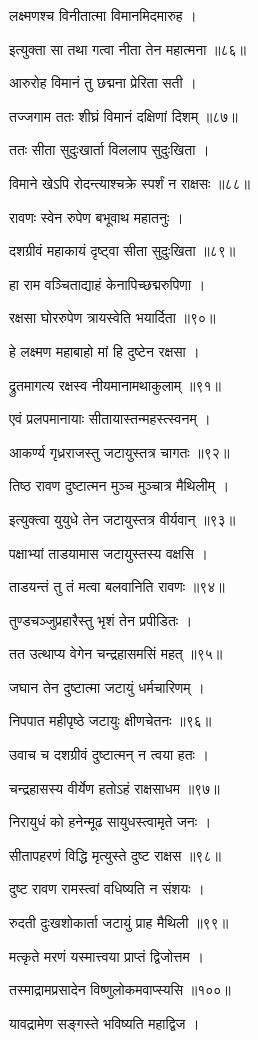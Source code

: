 लक्ष्मणश्च विनीतात्मा विमानमिदमारुह ।

इत्युक्ता सा तथा गत्वा नीता तेन महात्मना ॥८६॥

आरुरोह विमानं तु छद्मना प्रेरिता सती ।

तज्जगाम ततः शीघ्रं विमानं दक्षिणां दिशम् ॥८७॥

ततः सीता सुदुःखार्ता विललाप सुदुःखिता ।

विमाने खेऽपि रोदन्त्याश्चक्रे स्पर्शं न राक्षसः ॥८८॥

रावणः स्वेन रुपेण बभूवाथ महातनुः ।

दशग्रीवं महाकायं दृष्ट्वा सीता सुदुःखिता ॥८९॥

हा राम वञ्चिताद्याहं केनापिच्छद्मरुपिणा ।

रक्षसा घोररुपेण त्रायस्वेति भयार्दिता ॥९०॥

हे लक्ष्मण महाबाहो मां हि दुष्टेन रक्षसा ।

द्रुतमागत्य रक्षस्व नीयमानामथाकुलाम् ॥९१॥

एवं प्रलपमानायाः सीतायास्तन्महस्त्स्वनम् ।

आकर्ण्य गृध्रराजस्तु जटायुस्तत्र चागतः ॥९२॥

तिष्ठ रावण दुष्टात्मन मुञ्च मुञ्चात्र मैथिलीम् ।

इत्युक्त्वा युयुधे तेन जटायुस्तत्र वीर्यवान् ॥९३॥

पक्षाभ्यां ताडयामास जटायुस्तस्य वक्षसि ।

ताडयन्तं तु तं मत्वा बलवानिति रावणः ॥९४॥

तुण्डचञ्जुप्रहारैस्तु भृशं तेन प्रपीडितः ।

तत उत्थाप्य वेगेन चन्द्रहासमसिं महत् ॥९५॥

जघान तेन दुष्टात्मा जटायुं धर्मचारिणम् ।

निपपात महीपृष्ठे जटायुः क्षीणचेतनः ॥९६॥

उवाच च दशग्रीवं दुष्टात्मन् न त्वया हतः ।

चन्द्रहासस्य वीर्येण हतोऽहं राक्षसाधम ॥९७॥

निरायुधं को हनेन्मूढ सायुधस्त्वामृते जनः ।

सीतापहरणं विद्धि मृत्युस्ते दुष्ट राक्षस ॥९८॥

दुष्ट रावण रामस्त्वां वधिष्यति न संशयः ।

रुदती दुःखशोकार्ता जटायुं प्राह मैथिली ॥९९॥

मत्कृते मरणं यस्मात्त्वया प्राप्तं द्विजोत्तम ।

तस्माद्रामप्रसादेन विष्णुलोकमवाप्स्यसि ॥१००॥

यावद्रामेण सङ्गस्ते भविष्यति महाद्विज ।

